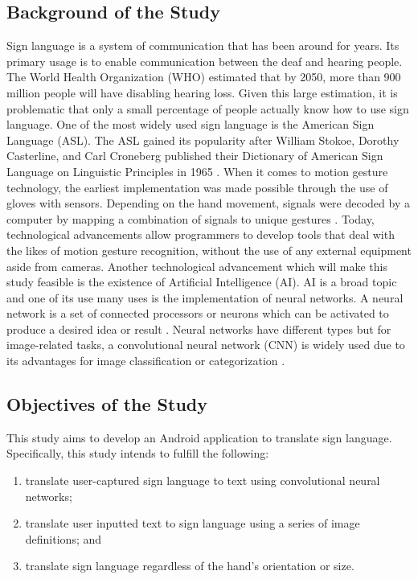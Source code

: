 \documentclass[journal]{./IEEE/IEEEtran}
\begin{document}
\subsection{Background of the Study}
Sign language is a system of communication that has been around for years. Its primary usage is to enable communication between the deaf and hearing people. The World Health Organization (WHO) \cite{WHO2018} estimated that by 2050, more than 900 million people will have disabling hearing loss. Given this large estimation, it is problematic that only a small percentage of people actually know how to use sign language. One of the most widely used sign language is the American Sign Language (ASL). The ASL gained its popularity after William Stokoe, Dorothy Casterline, and Carl Croneberg published their Dictionary of American Sign Language on Linguistic Principles in 1965 \cite{Wilcox1991}.
\newline
\indent When it comes to motion gesture technology, the earliest implementation was made possible through the use of gloves with sensors. Depending on the hand movement, signals were decoded by a computer by mapping a combination of signals to unique gestures \cite{Sharma2015}.  Today, technological advancements allow programmers to develop tools that deal with the likes of motion gesture recognition, without the use of any external equipment aside from cameras.
\newline
\indent Another technological advancement which will make this study feasible is the existence of Artificial Intelligence (AI). AI is a broad topic and one of its use many uses is the implementation of neural networks. A neural network is a set of connected processors or neurons which can be activated to produce a desired idea or result \cite{Schmidhuber2015}. Neural networks have different types but for image-related tasks, a convolutional neural network (CNN) is widely used due to its advantages for image classification or categorization \cite{Wu2016}.

\subsection{Objectives of the Study}
This study aims to develop an Android application to translate sign language. Specifically, this study intends to fulfill the following:

\begin{enumerate}
\item translate user-captured sign language to text using convolutional neural networks;
\item translate user inputted text to sign language using a series of image definitions; and
\item translate sign language regardless of the hand's orientation or size.
\end{enumerate}
\end{document}
